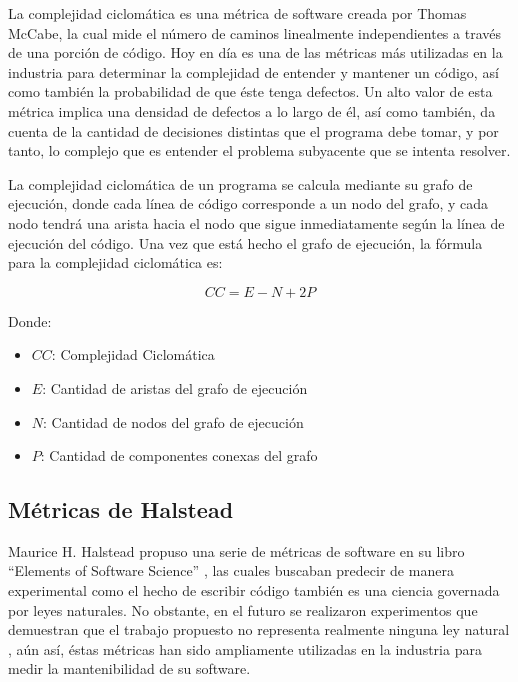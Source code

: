 \documentclass[letterpaper,12pt]{article}
\begin{document}
La complejidad ciclomática es una métrica de software creada por Thomas McCabe, la cual mide el número de caminos linealmente independientes a través de una porción de código\cite{7725232}. Hoy en día es una de las métricas más utilizadas en la industria para determinar la complejidad de entender y mantener un código, así como también la probabilidad de que éste tenga defectos. Un alto valor de esta métrica implica una densidad de defectos a lo largo de él, así como también, da cuenta de la cantidad de decisiones distintas que el programa debe tomar, y por tanto, lo complejo que es entender el problema subyacente que se intenta resolver.

La complejidad ciclomática de un programa se calcula mediante su grafo de ejecución, donde cada línea de código corresponde a un nodo del grafo, y cada nodo tendrá una arista hacia el nodo que sigue inmediatamente según la línea de ejecución del código. Una vez que está hecho el grafo de ejecución, la fórmula para la complejidad ciclomática es:

\begin{equation}
  CC = E - N + 2P
\end{equation}

Donde:

\begin{itemize}
  \item $CC$: Complejidad Ciclomática
  \item $E$: Cantidad de aristas del grafo de ejecución
  \item $N$: Cantidad de nodos del grafo de ejecución
  \item $P$: Cantidad de componentes conexas del grafo
\end{itemize}

\subsection{Métricas de Halstead}

Maurice H. Halstead propuso una serie de métricas de software en su libro ``Elements of Software Science'' \cite{10.5555/540137}, las cuales buscaban predecir de manera experimental como el hecho de escribir código también es una ciencia governada por leyes naturales. No obstante, en el futuro se realizaron experimentos que demuestran que el trabajo propuesto no representa realmente ninguna ley natural \cite{10.5555/800254.807762}, aún así, éstas métricas han sido ampliamente utilizadas en la industria para medir la mantenibilidad de su software.
\end{document}
